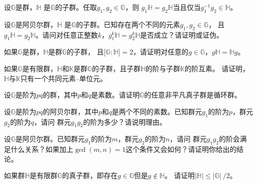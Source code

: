  \begin{problemset}
 \item \label{exe:coset}设$\mathbb{G}$是群，$\mathbb{H}$ 是$\mathbb{G}$的子群。任取$g_1, g_2 \in \mathbb{G}$，则
   		$g_1 \mathbb{H} = g_2 \mathbb{H}$当且仅当$g_1^{-1}g_2 \in \mathbb{H}$。
   		
 \item 设$\mathbb{G}$是阿贝尔群，$\mathbb{H}$ 是$\mathbb{G}$的子群。已知存在两个不同的元素$g_1, g_2 \in \mathbb{G}$，
 且$g_1 \mathbb{H} = g_2 \mathbb{H}$。请问对任意正整数$k$，$g_1^{k} \mathbb{H} = g_2^{k} \mathbb{H}$是否成立？请证明或证伪。
   		
 \item 如果$\mathbb{G}$是群，$\mathbb{H}$是群$\mathbb{G}$的子群，
  且$\lbrack \mathbb{G} : \mathbb{H}\rbrack =2$，请证明对任意的$g\in \mathbb{G}$，$g \mathbb{H} = \mathbb{H}g$。
  
  \item 如果$\mathbb{G}$是有限群，$\mathbb{H}$和$\mathbb{K}$是群$\mathbb{G}$的子群，且子群$\mathbb{H}$的阶与子群$\mathbb{K}$的阶互素。
  请证明，$\mathbb{H}$与$\mathbb{K}$只有一个共同元素--单位元。

 \item 设$\mathbb{G}$是阶为$pq$的群，其中$p$和$q$是素数。请证明$\mathbb{G}$的任意非平凡真子群是循环群。
 
 \item 设$\mathbb{G}$是阶为$pq$的阿贝尔群，其中$p$和$q$是两个不同的素数。已知群元$g_1$的阶为$p$，群元$g_2$的阶为$q$，请问
 群元$g_1 g_2$的阶为多少？请说明理由。
 
 \item 设$\mathbb{G}$是阿贝尔群。已知群元$g_1$的阶为$m$，群元$g_2$的阶为$n$，请问
 群元$g_1 g_2$的阶会满足什么关系？如果加上$\gcd(m,n)=1$这个条件又会如何？请证明你给出的结论。
   
 \item 如果群$\mathbb{H}$是有限群$\mathbb{G}$的真子群，即存在$g\in \mathbb{G}$但是$g \notin \mathbb{H}$。
 请证明$\vert \mathbb{H} \vert  \leq \vert \mathbb{G} \vert \ /2$。%
  

\end{problemset}
